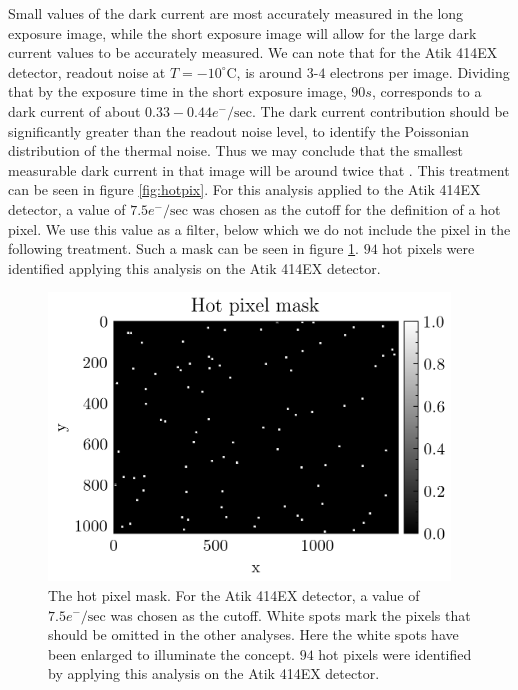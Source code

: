 \documentclass[../main.tex]{subfiles}
\begin{document}
		Small values of the dark current are most accurately measured in the long exposure image, while the short exposure image will allow for the large dark current values to be accurately measured. We can note that for the Atik 414EX detector, readout noise at $T = -10^\circ$C, is around $3$-$4$ electrons per image. Dividing that by the exposure time in the short exposure image, $90s$, corresponds to a dark current of about $0.33-0.44 e^-/\text{sec}$. The dark current contribution should be significantly greater than the readout noise level, to identify the Poissonian distribution of the thermal noise. Thus we may conclude that the smallest measurable dark current in that image will be around twice that \cite{CCDdatareductionguide}. This treatment can be seen in figure \ref{fig:hotpix}. For this analysis applied to the Atik 414EX detector, a value of $7.5 e^-/\text{sec}$ was chosen as the cutoff for the definition of a hot pixel. We use this value as a filter, below which we do not include the pixel in the following treatment. Such a mask can be seen in figure \ref{fig:hotpixmask}. $94$ hot pixels were identified applying this analysis on the Atik 414EX detector.
		
		\begin{figure}
			\centering			\includegraphics[width=0.95\textwidth]{hot_pixel_mask.png}
			\caption{The hot pixel mask. For the Atik 414EX detector, a value of $7.5 e^-/\text{sec}$ was chosen as the cutoff. White spots mark the pixels that should be omitted in the other analyses. Here the white spots have been enlarged to illuminate the concept. $94$ hot pixels were identified by applying this analysis on the Atik 414EX detector.}
			\label{fig:hotpixmask}
		\end{figure}
		
\end{document}
